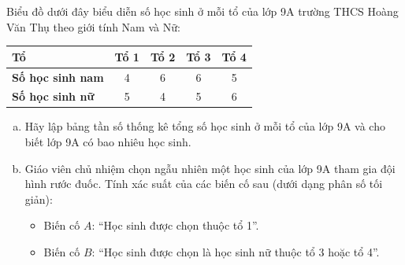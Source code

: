 \begin{bt}%
Biểu đồ dưới đây biểu diễn số học sinh ở mỗi tổ của lớp 9A trường THCS Hoàng Văn Thụ theo giới tính Nam và Nữ:
	\begin{center}
		\begin{tabular}{|l|c|c|c|c|}
			\hline
			\textbf{Tổ} & Tổ 1 & Tổ 2 & Tổ 3 & Tổ 4 \\
			\hline
			\textbf{Số học sinh nam} & 4 & 6 & 6 & 5 \\
			\hline
			\textbf{Số học sinh nữ} & 5 & 4 & 5 & 6 \\
			\hline
		\end{tabular}
	\end{center}
	\begin{enumerate}[a)]
		\item Hãy lập bảng tần số thống kê tổng số học sinh ở mỗi tổ của lớp 9A và cho biết lớp 9A có bao nhiêu học sinh.
		\item Giáo viên chủ nhiệm chọn ngẫu nhiên một học sinh của lớp 9A tham gia đội hình rước đuốc. Tính xác suất của các biến cố sau (dưới dạng phân số tối giản):
		\begin{itemize}
			\item Biến cố $A$: ``Học sinh được chọn thuộc tổ 1''.
			\item Biến cố $B$: ``Học sinh được chọn là học sinh nữ thuộc tổ 3 hoặc tổ 4''.
		\end{itemize}
	\end{enumerate}
\end{bt}
